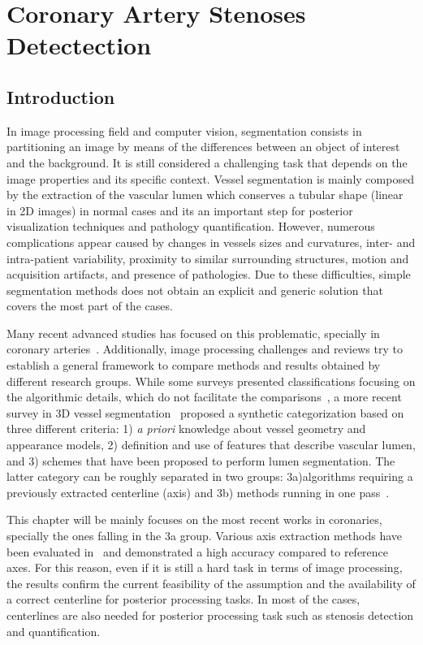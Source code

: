 \chapter{Coronary Artery Stenoses Detectection}
%

\section{Introduction}
%
In image processing field and computer vision, segmentation consists in partitioning an image by means of the differences between an object of interest and the background. It is still considered a challenging task that depends on the image properties and its specific context. Vessel segmentation is mainly composed by the extraction of the vascular lumen which conserves a tubular shape (linear in 2D images) in normal cases and its an important step for posterior visualization techniques and pathology quantification. However, numerous complications appear caused by changes in vessels sizes and curvatures, inter- and intra-patient variability, proximity to similar surrounding structures, motion and acquisition artifacts, and presence of pathologies. Due to these difficulties, simple segmentation methods does not obtain an explicit and generic solution that covers the most part of the cases.

Many recent advanced studies has focused on this problematic, specially in coronary arteries~\citep{Lesage2009Thesis, Schaap2010Thesis, Wang2011Thesis, Zuluaga2011Thesis}. Additionally, image processing challenges and reviews try to establish a general framework to compare methods and results obtained by different research groups. While some surveys presented classifications focusing on the algorithmic details, which do not facilitate the comparisons~\citep{Kirbas2004}, a more recent survey in 3D vessel segmentation~\citep{Lesage2009b} proposed a synthetic categorization based on three different criteria: 1) \textit{a priori} knowledge about vessel geometry and appearance models, 2) definition and use of features that describe vascular lumen, and 3) schemes that have been proposed to perform lumen segmentation. The latter category can be roughly separated in two groups: 3a)algorithms requiring a previously extracted centerline (axis) and 3b) methods running in one pass~\citep{Schaap2011}.

This chapter will be mainly focuses on the most recent works in coronaries, specially the ones falling in the 3a group. Various axis extraction methods have been evaluated in~\citep{Metz2008} and demonstrated a high accuracy compared to reference axes. For this reason, even if it is still a hard task in terms of image processing, the results confirm the current feasibility of the assumption and the availability of a correct centerline for posterior processing tasks. In most of the cases, centerlines are also needed for posterior processing task such as stenosis detection and quantification.

